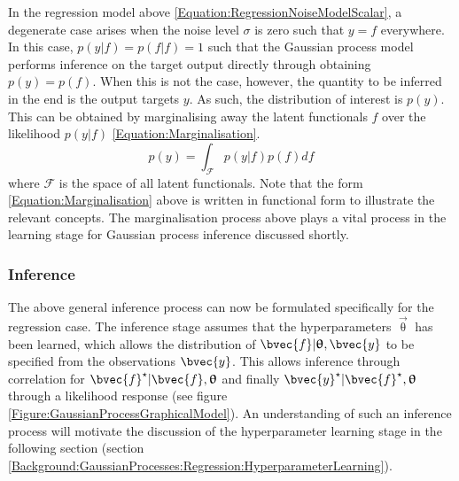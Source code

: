 				In the regression model above \eqref{Equation:RegressionNoiseModelScalar}, a degenerate case arises when the noise level $\sigma$ is zero such that $y = f$ everywhere. In this case, $p(y | f) = p(f | f) = 1$ such that the Gaussian process model performs inference on the target output directly through obtaining $p (y) = p(f)$. When this is not the case, however, the quantity to be inferred in the end is the output targets $y$. As such, the distribution of interest is $p(y)$. This can be obtained by marginalising away the latent functionals $f$ over the likelihood $p(y | f)$ \eqref{Equation:Marginalisation}. \begin{equation}
					p(y) = \int_{\mathscr{F}} p(y | f) p(f) df
				\label{Equation:Marginalisation}
				\end{equation} where $\mathscr{F}$ is the space of all latent functionals. Note that the form \eqref{Equation:Marginalisation} above is written in functional form to illustrate the relevant concepts. The marginalisation process above plays a vital process in the learning stage for Gaussian process inference discussed shortly.
		
			\subsubsection{Inference}
			\label{Background:GaussianProcesses:Regression:Inference}
			
				The above general inference process can now be formulated specifically for the regression case. The inference stage assumes that the hyperparameters $\vec{\uptheta}$ has been learned, which allows the distribution of $\bvec{f} | \vec{\uptheta}, \bvec{y}$ to be specified from the observations $\bvec{y}$. This allows inference through correlation for $\bvec{f}^{\star} | \bvec{f}, \vec{\uptheta}$ and finally $\bvec{y}^{\star} | \bvec{f}^{\star}, \vec{\uptheta}$ through a likelihood response (see figure \ref{Figure:GaussianProcessGraphicalModel}). An understanding of such an inference process will motivate the discussion of the hyperparameter learning stage in the following section (section \ref{Background:GaussianProcesses:Regression:HyperparameterLearning}).
				
